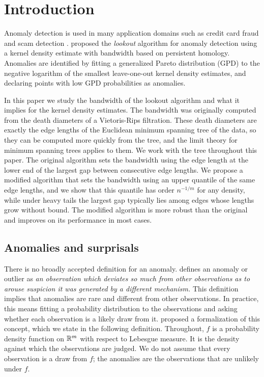 \section{Introduction} \label{sec:intro}

Anomaly detection is used in many application domains such as credit card fraud and scam detection \citep{kolupuri2025scams}.  \cite{lookout} proposed the \textit{lookout} algorithm for anomaly detection using a kernel density estimate with bandwidth based on persistent homology. Anomalies are identified by fitting a generalized Pareto distribution (GPD) to the negative logarithm of the smallest leave-one-out kernel density estimates, and declaring points with low GPD probabilities as anomalies.

In this paper we study the bandwidth of the lookout algorithm and what it implies for the kernel density estimates. The bandwidth was originally computed from the death diameters of a Vietoris-Rips filtration. These death diameters are exactly the edge lengths of the Euclidean minimum spanning tree of the data, so they can be computed more quickly from the tree, and the limit theory for minimum spanning trees applies to them. We work with the tree throughout this paper. The original algorithm sets the bandwidth using the edge length at the lower end of the largest gap between consecutive edge lengths. We propose a modified algorithm that sets the bandwidth using an upper quantile of the same edge lengths, and we show that this quantile has order $n^{-1/m}$ for any density, while under heavy tails the largest gap typically lies among edges whose lengths grow without bound. The modified algorithm is more robust than the original and improves on its performance in most cases.

\subsection{Anomalies and surprisals}

There is no broadly accepted definition for an anomaly. \citet{hawkins1980identification} defines an anomaly or outlier as \textit{an observation which deviates so much from other observations as to arouse suspicion it was generated by a different mechanism.} This definition implies that anomalies are rare and different from other observations. In practice, this means fitting a probability distribution to the observations and asking whether each observation is a likely draw from it. \citet{surprisals} proposed a formalization of this concept, which we state in the following definition. Throughout, $f$ is a probability density function on $\mathbb{R}^m$ with respect to Lebesgue measure. It is the density against which the observations are judged. We do not assume that every observation is a draw from $f$; the anomalies are the observations that are unlikely under $f$.

